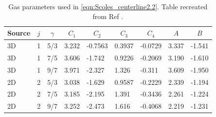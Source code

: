 \begin{table}[]
	\centering
	\begin{tabular}{lllllllll}
		\hline
		\multicolumn{1}{c}{Source} & \multicolumn{1}{c}{$j$} & \multicolumn{1}{c}{$\gamma$} & \multicolumn{1}{c}{$C_1$} & \multicolumn{1}{c}{$C_2$} & \multicolumn{1}{c}{$C_3$} & \multicolumn{1}{c}{$C_4$} & \multicolumn{1}{c}{$A$} & \multicolumn{1}{c}{$B$} \\ \hline
		3D                         & 1                     & 5/3                          & 3.232                     & -0.7563                   & 0.3937                    & -0.0729                   & 3.337                & -1.541                \\
		3D                         & 1                     & 7/5                          & 3.606                     & -1.742                    & 0.9226                    & -0.2069                   & 3.190                 & -1.610                \\
		3D                         & 1                     & 9/7                          & 3.971                     & -2.327                    & 1.326                     & -0.311                    & 3.609                 & -1.950                \\
		2D                         & 2                     & 5/3                          & 3.038                     & -1.629                    & 0.9587                    & -0.2229                   & 2.339                 & -1.194                \\
		2D                         & 2                     & 7/5                          & 3.185                     & -2.195                    & 1.391                     & -0.3436                   & 2.261                 & -1.224                \\
		2D                         & 2                     & 9/7                          & 3.252                     & -2.473                    & 1.616                     & -0.4068                   & 2.219                 & -1.231               
	\end{tabular}
	\caption{Gas parameters used in \cref{eqn:Scoles_centerline2.2}. Table recreated from Ref \cite{millerFreeJetSources1988}.}
	\label{tbl:Scoles_gas_params2.2}
\end{table}

